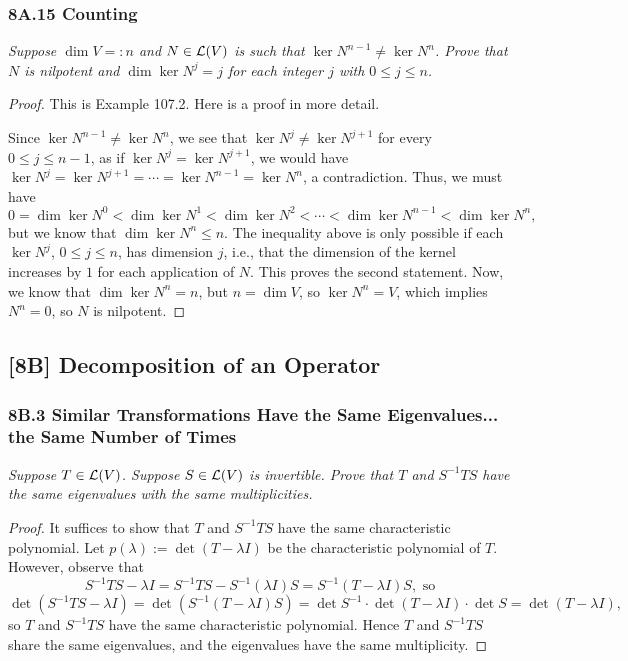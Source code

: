 \documentclass{article}
\begin{document}
\subsubsection*{8A.15 Counting}
\textit{Suppose $\dim V =: n$ and $N\in\mathcal L(V)$ is such that $\ker N^{n-1}\neq \ker N^n$. Prove that $N$ is nilpotent and $\dim\ker N^j=j$ for each integer $j$ with $0\leq j\leq n$.}
\begin{proof}
This is Example 107.2. Here is a proof in more detail.

Since $\ker N^{n-1}\neq \ker N^n$, we see that $\ker N^{j} \neq \ker N^{j+1}$ for every $0\leq j\leq n-1$, as if $\ker N^j = \ker N^{j+1}$, we would have $\ker N^j = \ker N^{j+1} = \cdots = \ker N^{n-1} = \ker N^n$, a contradiction. Thus, we must have
$$0=\dim\ker N^0 < \dim\ker N^1 < \dim\ker N^2 < \cdots < \dim\ker N^{n-1} < \dim\ker N^n,$$
but we know that $\dim\ker N^n \leq n$. The inequality above is only possible if each $\ker N^j$, $0\leq j\leq n$, has dimension $j$, i.e., that the dimension of the kernel increases by $1$ for each application of $N$. This proves the second statement. Now, we know that $\dim \ker N^n = n$, but $n= \dim V$, so $\ker N^n = V$, which implies $N^n = 0$, so $N$ is nilpotent.
\end{proof}
\subsection*{[8B] Decomposition of an Operator}
\subsubsection*{8B.3 Similar Transformations Have the Same Eigenvalues... the Same Number of Times}
\textit{Suppose $T\in\mathcal L(V)$. Suppose $S\in\mathcal L(V)$ is invertible. Prove that $T$ and $S^{-1}TS$ have the same eigenvalues with the same multiplicities.}
\begin{proof}
It suffices to show that $T$ and $S^{-1}TS$ have the same characteristic polynomial. Let $p(\lambda) := \det (T-\lambda I)$ be the characteristic polynomial of $T$. However, observe that
$$S^{-1}TS - \lambda I = S^{-1}TS - S^{-1}(\lambda I)S = S^{-1}(T-\lambda I)S, \textrm{ so}$$
$$\det(S^{-1}TS-\lambda I) = \det(S^{-1}(T-\lambda I)S) = \det S^{-1} \cdot \det(T - \lambda I)\cdot \det S = \det(T-\lambda I),$$
so $T$ and $S^{-1}TS$ have the same characteristic polynomial. Hence $T$ and $S^{-1}TS$ share the same eigenvalues, and the eigenvalues have the same multiplicity.
\end{proof}
\end{document}
